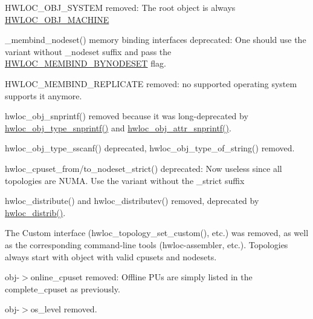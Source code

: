 \begin{DoxyItemize}
\item H\+W\+L\+O\+C\+\_\+\+O\+B\+J\+\_\+\+S\+Y\+S\+T\+EM removed\+: The root object is always \hyperlink{a00184_ggacd37bb612667dc437d66bfb175a8dc55a3f4e83ffc4a259354959ae8a9eaa2a80}{H\+W\+L\+O\+C\+\_\+\+O\+B\+J\+\_\+\+M\+A\+C\+H\+I\+NE} 


\item \+\_\+membind\+\_\+nodeset() memory binding interfaces deprecated\+: One should use the variant without \+\_\+nodeset suffix and pass the \hyperlink{a00191_ggab00475fd98815bf4fb9aaf752030e7d2a71f19fe4505f1c083dc8e6f7bdea6256}{H\+W\+L\+O\+C\+\_\+\+M\+E\+M\+B\+I\+N\+D\+\_\+\+B\+Y\+N\+O\+D\+E\+S\+ET} flag. 


\item H\+W\+L\+O\+C\+\_\+\+M\+E\+M\+B\+I\+N\+D\+\_\+\+R\+E\+P\+L\+I\+C\+A\+TE removed\+: no supported operating system supports it anymore. 


\item hwloc\+\_\+obj\+\_\+snprintf() removed because it was long-\/deprecated by \hyperlink{a00188_gadb8765c260edea80c52cd06a76639ba4}{hwloc\+\_\+obj\+\_\+type\+\_\+snprintf()} and \hyperlink{a00188_ga870e876931c282a1c7aee2f031912ce3}{hwloc\+\_\+obj\+\_\+attr\+\_\+snprintf()}. 


\item hwloc\+\_\+obj\+\_\+type\+\_\+sscanf() deprecated, hwloc\+\_\+obj\+\_\+type\+\_\+of\+\_\+string() removed. 


\item hwloc\+\_\+cpuset\+\_\+from/to\+\_\+nodeset\+\_\+strict() deprecated\+: Now useless since all topologies are N\+U\+MA. Use the variant without the \+\_\+strict suffix 


\item hwloc\+\_\+distribute() and hwloc\+\_\+distributev() removed, deprecated by \hyperlink{a00201_ga7b0c28f797c2ff17fa2f244ebbd55b33}{hwloc\+\_\+distrib()}. 


\item The Custom interface (hwloc\+\_\+topology\+\_\+set\+\_\+custom(), etc.) was removed, as well as the corresponding command-\/line tools (hwloc-\/assembler, etc.). Topologies always start with object with valid cpusets and nodesets. 


\item {\ttfamily obj-\/$>$online\+\_\+cpuset} removed\+: Offline P\+Us are simply listed in the {\ttfamily complete\+\_\+cpuset} as previously. 


\item {\ttfamily obj-\/$>$os\+\_\+level} removed. 


\end{DoxyItemize}